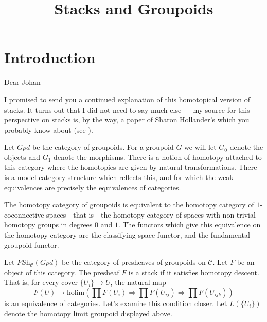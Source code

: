 

%


\title{Stacks and Groupoids}


\maketitle

\tableofcontents

\section{Introduction}
\label{section-introduction}

Dear Johan

\medskip\noindent
I promised to send you a continued explanation of this homotopical version
of stacks.  It turns out that I did not need to say much else --- my
source for this perspective on stacks is, by the way, a paper of
Sharon Hollander's which you probably know about (see \cite{Hollander}).

\medskip\noindent
Let $\textit{Gpd}$ be the
category of groupoids.  For a groupoid $G$ we will let $G_0$ denote the
objects and $G_1$ denote the morphisms.
There is a notion of homotopy attached to this
category where the homotopies are given by natural transformations.  There
is a model category structure which reflects this, and for which the weak
equivalences are precisely the equivalences of categories.

\medskip\noindent
The homotopy category of groupoids is equivalent to the homotopy category
of $1$-coconnective spaces - that is - the homotopy category of spaces
with non-trivial homotopy groups in degrees $0$ and $1$.  The functors
which give this equivalence on the homotopy category are the classifying
space functor, and the fundamental groupoid functor.


\medskip\noindent
Let $\textit{PSh}_\mathcal{C}(\textit{Gpd})$
be the category of presheaves of groupoids
on $\mathcal{C}$.  Let $F$ be an object of this category.  The presheaf $F$
is a stack if it satisfies homotopy descent.  That is, for every cover $\{
U_i \} \rightarrow U$, the natural map
$$
F(U)
\rightarrow
\text{holim}
\left(
\prod F(U_i) \Rightarrow \prod F(U_{ij}) \Rightarrow \prod F(U_{ijk})
\right)
$$
is an equivalence of categories.  Let's examine this condition closer.  Let
$L(\{U_i\})$ denote the homotopy limit groupoid displayed above.


